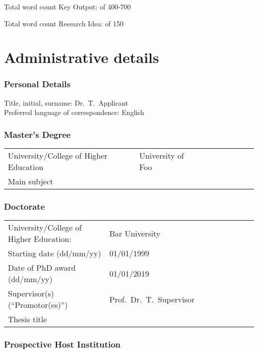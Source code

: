 \documentclass[a4paper,9.5pt,fleqn]{application}
\begin{document}
\ifdefined\haveFirstLit
\vspace{1cm}Total word count \thesection{} Key Output:  of 400-700\\
\fi

\ifdefined\haveAbstract

\fi

\ifdefined\haveFirstLit
\vspace{1cm}Total word count \thesection{} Research Idea:  of 150\\
\fi

\ifdefined\haveFirstLit

\newpage
\part{Administrative details}
\section{Personal Details}
Title, initial, surname: Dr.\ T.\ Applicant\\
Preferred language of correspondence: English


\section{Master's Degree}
\begin{tabular}{lllllllll}
University/College of Higher Education& University of Foo\\
Main subject& 
\end{tabular}

\section{Doctorate}
\begin{tabular}{lllllllll}
University/College of Higher Education:& Bar University\\
Starting date (dd/mm/yy)& 01/01/1999\\
Date of PhD award (dd/mm/yy)&   01/01/2019\\
Supervisor(s) (``Promotor(es)'')& Prof.\ Dr.\ T.\ Supervisor\\
Thesis title& 
\end{tabular}

\section{Prospective Host Institution}
\end{document}
